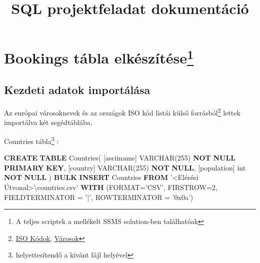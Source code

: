 \documentclass[
]{article}
\title{SQL projektfeladat dokumentáció}
\date{}
\newenvironment{Shaded}{\begin{snugshade}}{\end{snugshade}}
\newcommand{\DataTypeTok}[1]{\textcolor[rgb]{0.56,0.13,0.00}{#1}}
\newcommand{\DecValTok}[1]{\textcolor[rgb]{0.25,0.63,0.44}{#1}}
\newcommand{\KeywordTok}[1]{\textcolor[rgb]{0.00,0.44,0.13}{\textbf{#1}}}
\newcommand{\NormalTok}[1]{#1}
\newcommand{\OperatorTok}[1]{\textcolor[rgb]{0.40,0.40,0.40}{#1}}
\newcommand{\StringTok}[1]{\textcolor[rgb]{0.25,0.44,0.63}{#1}}
\begin{document}
\maketitle

\hypertarget{bookings-tuxe1bla-elkuxe9szuxedtuxe9se1}{%
\section[Bookings tábla elkészítése]{\texorpdfstring{Bookings tábla
elkészítése\footnote{A teljes scriptek a mellékelt SSMS solution-ben
  találhatóak}}{Bookings tábla elkészítése}}\label{bookings-tuxe1bla-elkuxe9szuxedtuxe9se1}}

\hypertarget{kezdeti-adatok-importuxe1luxe1sa}{%
\subsection{Kezdeti adatok
importálása}\label{kezdeti-adatok-importuxe1luxe1sa}}

Az európai városoknevek és az országok ISO kód listái külső
forrásból\footnote{\href{https://datahub.io/core/country-list?fbclid=IwAR1Kapllmzc9sthOPNstkF23BomEfkQeLyivSLC2joxgqqdsoksLm9FP3qw}{ISO
  Kódok},
  \href{http://worldpopulationreview.com/continents/cities-in-europe/?fbclid=IwAR2zDepceQtlVAJOgoXHoPPrG6RKVhriUGgWYut_feKryAoLXVCs36y-Ip0}{Városok}}
lettek importálva két segédtáblába.

Countries tábla\footnote{\emph{} helyettesítendő a kívánt fájl helyével}
:

\begin{Shaded}
\begin{Highlighting}[]
\KeywordTok{CREATE} \KeywordTok{TABLE}\NormalTok{ Countries(}
\NormalTok{    [asciiname] }\DataTypeTok{VARCHAR}\NormalTok{(}\DecValTok{255}\NormalTok{) }\KeywordTok{NOT} \KeywordTok{NULL} \KeywordTok{PRIMARY} \KeywordTok{KEY}\NormalTok{,}
\NormalTok{    [country] }\DataTypeTok{VARCHAR}\NormalTok{(}\DecValTok{255}\NormalTok{) }\KeywordTok{NOT} \KeywordTok{NULL}\NormalTok{,}
\NormalTok{    [population] }\DataTypeTok{int} \KeywordTok{NOT} \KeywordTok{NULL}
\NormalTok{)}
\KeywordTok{BULK} \KeywordTok{INSERT}\NormalTok{ Countries}
\KeywordTok{FROM} \StringTok{'<Elérési Útvonal>\textbackslash{}countries.csv'}
\KeywordTok{WITH}\NormalTok{ (FORMAT}\OperatorTok{=}\StringTok{'CSV'}\NormalTok{,}
\NormalTok{    FIRSTROW}\OperatorTok{=}\DecValTok{2}\NormalTok{,}
\NormalTok{    FIELDTERMINATOR }\OperatorTok{=} \StringTok{'|'}\NormalTok{,}
\NormalTok{    ROWTERMINATOR }\OperatorTok{=} \StringTok{'0x0a'}\NormalTok{)}
\end{Highlighting}
\end{Shaded}
\end{document}

